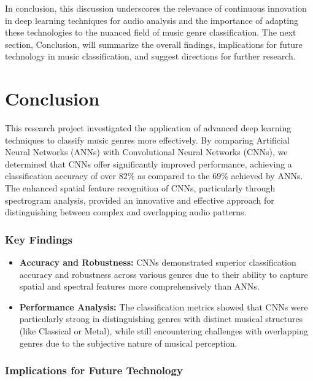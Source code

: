 \documentclass[lettersize,journal]{IEEEtran}
\begin{document}
In conclusion, this discussion underscores the relevance of continuous innovation in deep learning techniques for audio analysis and the importance of adapting these technologies to the nuanced field of music genre classification. The next section, Conclusion, will summarize the overall findings, implications for future technology in music classification, and suggest directions for further research.


\section{Conclusion}

This research project investigated the application of advanced deep learning techniques to classify music genres more effectively. By comparing Artificial Neural Networks (ANNs) with Convolutional Neural Networks (CNNs), we determined that CNNs offer significantly improved performance, achieving a classification accuracy of over 82\% as compared to the 69\% achieved by ANNs. The enhanced spatial feature recognition of CNNs, particularly through spectrogram analysis, provided an innovative and effective approach for distinguishing between complex and overlapping audio patterns.
\vspace{\baselineskip}

\subsubsection{Key Findings}

\begin{itemize}
    \item \textbf{Accuracy and Robustness:} CNNs demonstrated superior classification accuracy and robustness across various genres due to their ability to capture spatial and spectral features more comprehensively than ANNs.
    \item \textbf{Performance Analysis:} The classification metrics showed that CNNs were particularly strong in distinguishing genres with distinct musical structures (like Classical or Metal), while still encountering challenges with overlapping genres due to the subjective nature of musical perception.
\end{itemize}

\subsubsection{Implications for Future Technology}
\end{document}
